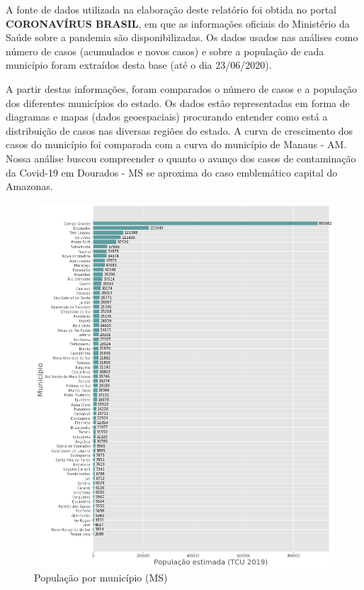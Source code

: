 \documentclass[12pt]{article}
\begin{document}
A fonte de dados utilizada na elaboração deste relatório foi obtida no portal \textbf{CORONAVÍRUS BRASIL}\cite{minsaude}, em que as informações oficiais do Ministério da Saúde sobre a pandemia são disponibilizadas. Os dados usados nas análises como número de casos (acumulados e novos casos) e sobre a população de cada município foram extraídos desta base (até o dia 23/06/2020). 

A partir destas informações, foram comparados o número de casos e a população dos diferentes municípios do estado. Os dados estão representadas em forma de diagramas e mapas (dados geoespaciais) procurando entender como está a distribuição de casos nas diversas regiões do estado. A curva de crescimento dos casos do município foi comparada com a curva do município de Manaus - AM. Nossa análise buscou compreender o quanto o avanço dos casos de contaminação da Covid-19 em Dourados - MS se aproxima do caso emblemático capital do Amazonas.

\begin{figure}[!htb]
  \centering
  \includegraphics[width=1\textwidth]{figs/pop_por_municipio.png}
  \caption{População por município (MS)}
  \label{fig:popuMuniMS}
  \end{figure}
\end{document}
